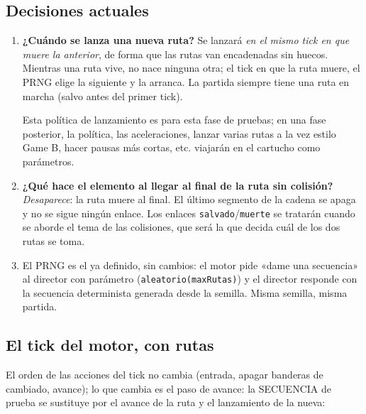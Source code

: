 	\subsection{Decisiones actuales}
	
	\begin{enumerate}	
		\item \textbf{¿Cuándo se lanza una nueva ruta?} Se lanzará \emph{en el mismo tick en que muere la anterior}, de forma
		que las rutas van encadenadas sin huecos. Mientras una ruta vive, no
		nace ninguna otra; el tick en que la ruta muere, el PRNG elige la
		siguiente y la arranca. La partida siempre tiene una ruta en marcha
		(salvo antes del primer tick).
		
		Esta política de lanzamiento es para esta fase de pruebas; en una fase
		posterior, la política, las aceleraciones, lanzar varias rutas a
		la vez estilo Game B, hacer pausas más cortas, etc. viajarán en el
		cartucho como parámetros. 
		
		\item \textbf{¿Qué hace el elemento al llegar al final de la ruta
			sin colisión?} \emph{Desaparece}: la ruta muere al final.
		El último segmento de la cadena se apaga y no se sigue
		ningún enlace. Los enlaces \texttt{salvado}/\texttt{muerte}
		se tratarán cuando se aborde el tema de las colisiones, que será la que
		decida cuál de los dos rutas se toma.
		
		\item El PRNG es el ya definido, sin cambios: el motor pide
		«dame una secuencia» al director con parámetro
		(\texttt{aleatorio(maxRutas)}) y el director responde con la
		secuencia determinista generada desde la semilla. Misma semilla, misma
		partida.
	\end{enumerate}
	
	\subsection{El tick del motor, con rutas}
	
	El orden de las acciones del tick no cambia (entrada, apagar
	banderas de cambiado, avance); lo que cambia es el paso de avance:
	la SECUENCIA de prueba se sustituye por el avance de la ruta y el
	lanzamiento de la nueva:
	
